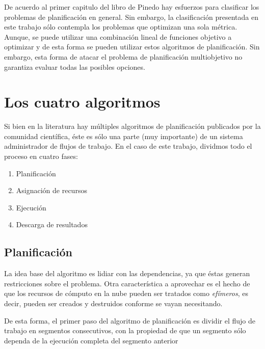 De acuerdo al primer capitulo del libro de Pinedo \cite{pinedo2012scheduling} hay esfuerzos para clasificar los problemas de planificación en general. Sin embargo, la clasificación presentada en este trabajo sólo contempla los problemas que optimizan una sola métrica. Aunque, se puede utilizar una combinación lineal de funciones objetivo a optimizar y de esta forma se pueden utilizar estos algoritmos de planificación. Sin embargo, esta forma de atacar el problema de planificación multiobjetivo no garantiza evaluar todas las posibles opciones. 





\section{Los cuatro algoritmos}

Si bien en la literatura hay múltiples algoritmos de planificación publicados por la comunidad científica, éste es sólo una parte (muy importante) de un sistema administrador de flujos de trabajo. En el caso de este trabajo, dividmos todo el proceso en cuatro fases:

\begin{enumerate}
\item{Planificación}
\item{Asignación de recursos}
\item{Ejecución}
\item{Descarga de resultados}
\end{enumerate}



\subsection{Planificación}

La idea base del algoritmo es lidiar con las dependencias, ya que éstas generan restricciones sobre el problema. Otra característica a aprovechar es el hecho de que los recursos de cómputo en la nube pueden ser tratados como \emph{efímeros}, es decir, pueden ser creados y destruidos conforme se vayan necesitando.

De esta forma, el primer paso del algoritmo de planificación es dividir el flujo de trabajo en segmentos consecutivos, con la propiedad de que un segmento sólo dependa de la ejecución completa del segmento anterior


